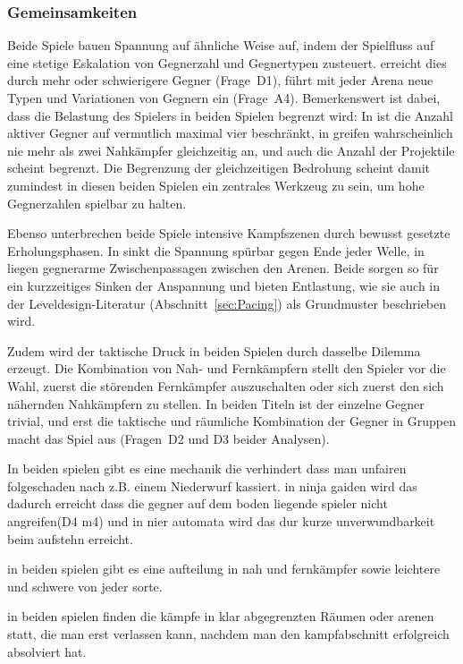 \documentclass[../Main.tex]{subfiles}
\begin{document}
\subsubsection{Gemeinsamkeiten}

Beide Spiele bauen Spannung auf ähnliche Weise auf, indem der Spielfluss auf eine stetige Eskalation von Gegnerzahl und Gegnertypen zusteuert.  erreicht dies durch mehr oder schwierigere Gegner (Frage~D1),  führt mit jeder Arena neue Typen und Variationen von Gegnern ein (Frage~A4). Bemerkenswert ist dabei, dass die Belastung des Spielers in beiden Spielen begrenzt wird: In  ist die Anzahl aktiver Gegner auf vermutlich maximal vier beschränkt, in  greifen wahrscheinlich nie mehr als zwei Nahkämpfer gleichzeitig an, und auch die Anzahl der Projektile scheint begrenzt. Die Begrenzung der gleichzeitigen Bedrohung scheint damit zumindest in diesen beiden Spielen ein zentrales Werkzeug zu sein, um hohe Gegnerzahlen spielbar zu halten.

Ebenso unterbrechen beide Spiele intensive Kampfszenen durch bewusst gesetzte Erholungsphasen. In  sinkt die Spannung spürbar gegen Ende jeder Welle, in  liegen gegnerarme Zwischenpassagen zwischen den Arenen. Beide sorgen so für ein kurzzeitiges Sinken der Anspannung und bieten Entlastung, wie sie auch in der Leveldesign-Literatur (Abschnitt~\ref{sec:Pacing}) als Grundmuster beschrieben wird.

Zudem wird der taktische Druck in beiden Spielen durch dasselbe Dilemma erzeugt. Die Kombination von Nah- und Fernkämpfern stellt den Spieler vor die Wahl, zuerst die störenden Fernkämpfer auszuschalten oder sich zuerst den sich nähernden Nahkämpfern zu stellen. In beiden Titeln ist der einzelne Gegner trivial, und erst die taktische und räumliche Kombination der Gegner in Gruppen macht das Spiel aus (Fragen~D2 und D3 beider Analysen).

In beiden spielen gibt es eine mechanik die verhindert dass man unfairen folgeschaden nach z.B. einem Niederwurf kassiert. in ninja gaiden wird das dadurch erreicht dass die gegner auf dem boden liegende spieler nicht angreifen(D4 m4) und in nier automata wird das dur kurze unverwundbarkeit beim aufstehn erreicht.

in beiden spielen gibt es eine aufteilung in nah und fernkämpfer sowie leichtere und schwere von jeder sorte.

in beiden spielen finden die kämpfe in klar abgegrenzten Räumen oder arenen statt, die man erst verlassen kann, nachdem man den kampfabschnitt erfolgreich absolviert hat.
\end{document}
